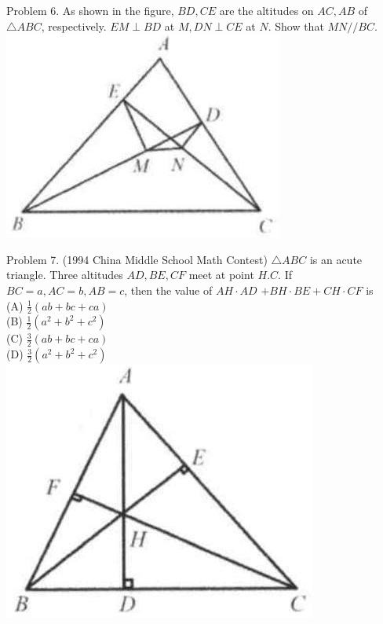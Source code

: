 \documentclass[10pt]{article}
\begin{document}
Problem 6. As shown in the figure, \(B D, C E\) are the altitudes on \(A C, A B\) of \(\triangle A B C\), respectively. \(E M \perp B D\) at \(M, D N \perp C E\) at \(N\). Show that \(M N / / B C\).\\
\includegraphics[max width=\textwidth, center]{2025_04_17_97bc1f7e44d93c271a88g-207(3)}

Problem 7. (1994 China Middle School Math Contest) \(\triangle A B C\) is an acute triangle. Three altitudes \(A D, B E, C F\) meet at point \(H . C\). If \(B C=a, A C=b, A B=c\), then the value of \(A H \cdot A D\) \(+B H \cdot B E+C H \cdot C F\) is\\
(A) \(\frac{1}{2}(a b+b c+c a)\)\\
(B) \(\frac{1}{2}\left(a^{2}+b^{2}+c^{2}\right)\)\\
(C) \(\frac{3}{2}(a b+b c+c a)\)\\
(D) \(\frac{3}{2}\left(a^{2}+b^{2}+c^{2}\right)\)\\
\includegraphics[max width=\textwidth, center]{2025_04_17_97bc1f7e44d93c271a88g-207(1)}
\end{document}
